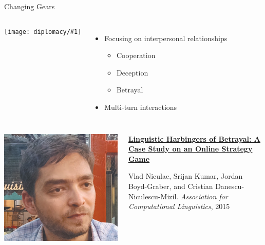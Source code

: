 \documentclass[compress]{beamer}
\newcommand{\gfxd}[2]{
	\begin{center}
		\texttt{[image: diplomacy/\#1]}
	\end{center}
}
\newif\ifdiplomacy\diplomacytrue
\begin{document}
\ifdiplomacy    

\begin{frame}{Changing Gears}
	
	\begin{columns}
		
		\gfxd{cicero_science}{1.0}
		\begin{itemize}
			\item Focusing on interpersonal relationships
			\begin{itemize}
				\item Cooperation
				\item Deception
				\item Betrayal
			\end{itemize}
			\item Multi-turn interactions
		\end{itemize}
		
	\end{columns}
	
	
\end{frame}

\begin{frame}{}
	
	\begin{columns}
		\column{.5\linewidth}
		\includegraphics[width=0.7\linewidth]{general_figures/vlad}
		\column{.5\linewidth}
		\begin{block}{{\bf
					\href{http://cs.colorado.edu/~jbg//docs/2015_acl_diplomacy.pdf}{Linguistic Harbingers of Betrayal: A Case Study on an Online Strategy Game}}}
			
			Vlad Niculae, Srijan Kumar, Jordan Boyd-Graber, and Cristian
			Danescu-Niculescu-Mizil. \emph{Association for Computational Linguistics}, 2015
		\end{block}
		
	\end{columns}
\end{frame}
\end{document}
